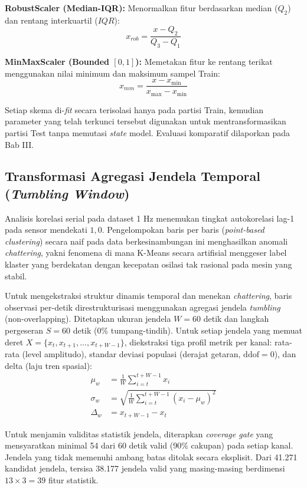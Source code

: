 \documentclass[conference]{IEEEtran}
\begin{document}
\textbf{RobustScaler (Median-IQR):} Menormalkan fitur berdasarkan median ($Q_2$) dan rentang interkuartil ($IQR$):
\begin{equation}
x_{rob} = \frac{x - Q_2}{Q_3 - Q_1}
\end{equation}

\textbf{MinMaxScaler (Bounded $[0,1]$):} Memetakan fitur ke rentang terikat menggunakan nilai minimum dan maksimum sampel Train:
\begin{equation}
x_{mm} = \frac{x - x_{\min}}{x_{\max} - x_{\min}}
\end{equation}

Setiap skema di-\textit{fit} secara terisolasi hanya pada partisi Train, kemudian parameter yang telah terkunci tersebut digunakan untuk mentransformasikan partisi Test tanpa memutasi \textit{state} model. Evaluasi komparatif dilaporkan pada Bab III.

\subsection{Transformasi Agregasi Jendela Temporal (\textit{Tumbling Window})}
Analisis korelasi serial pada dataset 1 Hz menemukan tingkat autokorelasi lag-1 pada sensor mendekati $1{,}0$. Pengelompokan baris per baris (\textit{point-based clustering}) secara naif pada data berkesinambungan ini menghasilkan anomali \textit{chattering}, yakni fenomena di mana K-Means secara artifisial menggeser label klaster yang berdekatan dengan kecepatan osilasi tak rasional pada mesin yang stabil.

Untuk mengekstraksi struktur dinamis temporal dan menekan \textit{chattering}, baris observasi per-detik direstrukturisasi menggunakan agregasi jendela \textit{tumbling} (non-overlapping). Ditetapkan ukuran jendela $W = 60$ detik dan langkah pergeseran $S = 60$ detik (0\% tumpang-tindih). Untuk setiap jendela yang memuat deret $X = \{x_t, x_{t+1}, \dots, x_{t+W-1}\}$, diekstraksi tiga profil metrik per kanal: rata-rata (level amplitudo), standar deviasi populasi (derajat getaran, $\text{ddof}=0$), dan delta (laju tren spasial):
\begin{align}
\mu_w &= \frac{1}{W} \sum_{i=t}^{t+W-1} x_i \\
\sigma_w &= \sqrt{\frac{1}{W} \sum_{i=t}^{t+W-1} (x_i - \mu_w)^2} \\
\Delta_w &= x_{t+W-1} - x_t
\end{align}

Untuk menjamin validitas statistik jendela, diterapkan \textit{coverage gate} yang mensyaratkan minimal 54 dari 60 detik valid (90\% cakupan) pada setiap kanal. Jendela yang tidak memenuhi ambang batas ditolak secara eksplisit. Dari 41.271 kandidat jendela, tersisa 38.177 jendela valid yang masing-masing berdimensi $13 \times 3 = 39$ fitur statistik.
\end{document}

